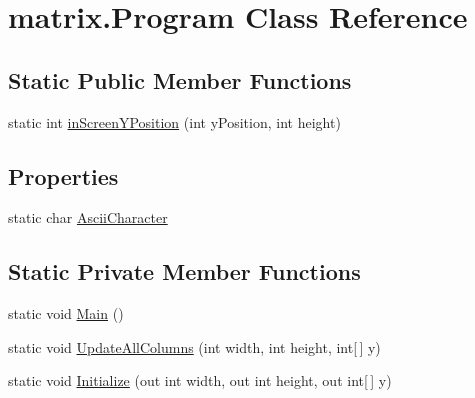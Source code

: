 \hypertarget{classmatrix_1_1_program}{\section{matrix.\-Program Class Reference}
\label{classmatrix_1_1_program}
}
\subsection*{Static Public Member Functions}
\begin{DoxyCompactItemize}
\item 
static int \hyperlink{classmatrix_1_1_program_ae800bb3943994a4c6d5595fcb01370c5}{in\-Screen\-Y\-Position} (int y\-Position, int height)
\end{DoxyCompactItemize}
\subsection*{Properties}
\begin{DoxyCompactItemize}
\item 
static char \hyperlink{classmatrix_1_1_program_ae4f0df2b9f302e657820ea236f831664}{Ascii\-Character}
\end{DoxyCompactItemize}
\subsection*{Static Private Member Functions}
\begin{DoxyCompactItemize}
\item 
static void \hyperlink{classmatrix_1_1_program_aa45e7cdc65635c198fc584aa87c8475b}{Main} ()
\item 
static void \hyperlink{classmatrix_1_1_program_a01bf0ffc74243e0f4379994d5105093a}{Update\-All\-Columns} (int width, int height, int\mbox{[}$\,$\mbox{]} y)
\item 
static void \hyperlink{classmatrix_1_1_program_a69074a2933e93bcd5bec11255ad05cfe}{Initialize} (out int width, out int height, out int\mbox{[}$\,$\mbox{]} y)
\end{DoxyCompactItemize}
